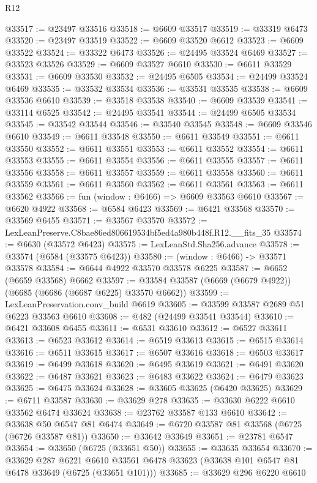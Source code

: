 \begin{lexlean}{R12}
\begin{coremodule}
@33517 := @23497 @33516
@33518 := @6609 @33517
@33519 := @33319 @6473
@33520 := @23497 @33519
@33522 := @6609 @33520 @6612
@33523 := @6609 @33522
@33524 := @33322 @6473
@33526 := @24495 @33524 @6469
@33527 := @33523 @33526
@33529 := @6609 @33527 @6610
@33530 := @6611 @33529
@33531 := @6609 @33530
@33532 := @24495 @6505
@33534 := @24499 @33524 @6469
@33535 := @33532 @33534
@33536 := @33531 @33535
@33538 := @6609 @33536 @6610
@33539 := @33518 @33538
@33540 := @6609 @33539
@33541 := @33114 @6525
@33542 := @24495 @33541
@33544 := @24499 @6505 @33534
@33545 := @33542 @33544
@33546 := @33540 @33545
@33548 := @6609 @33546 @6610
@33549 := @6611 @33548
@33550 := @6611 @33549
@33551 := @6611 @33550
@33552 := @6611 @33551
@33553 := @6611 @33552
@33554 := @6611 @33553
@33555 := @6611 @33554
@33556 := @6611 @33555
@33557 := @6611 @33556
@33558 := @6611 @33557
@33559 := @6611 @33558
@33560 := @6611 @33559
@33561 := @6611 @33560
@33562 := @6611 @33561
@33563 := @6611 @33562
@33566 := fun (window : @6466) => @6609 @33563 @6610
@33567 := @6620 @4922
@33568 := @6584 @6423
@33569 := @6421 @33568
@33570 := @33569 @6455
@33571 := @33567 @33570
@33572 := LexLeanPreserve.C8bae86ed806619534bf5ed4a980b448f.R12.__fits_35
@33574 := @6630 (@33572 @6423)
@33575 := LexLeanStd.Sha256.advance
@33578 := @33574 (@6584 (@33575 @6423))
@33580 := (window : @6466) -> @33571 @33578
@33584 := @6644 @4922 @33570 @33578 @6225
@33587 := @6652 (@6659 @33568) @6662
@33597 := @33584 @33587 (@6669 (@6679 @4922)) (@6685 (@6686 (@6687 @6225) @33570 @6662))
@33599 := LexLeanPreservation.conv_build @6619
@33605 := @33599 @33587 @2689 @51 @6223 @33563 @6610
@33608 := @482 (@24499 @33541 @33544)
@33610 := @6421 @33608 @6455
@33611 := @6531 @33610
@33612 := @6527 @33611
@33613 := @6523 @33612
@33614 := @6519 @33613
@33615 := @6515 @33614
@33616 := @6511 @33615
@33617 := @6507 @33616
@33618 := @6503 @33617
@33619 := @6499 @33618
@33620 := @6495 @33619
@33621 := @6491 @33620
@33622 := @6487 @33621
@33623 := @6483 @33622
@33624 := @6479 @33623
@33625 := @6475 @33624
@33628 := @33605 @33625 (@6420 @33625)
@33629 := @6711 @33587
@33630 := @33629 @278
@33635 := @33630 @6222 @6610 @33562 @6474 @33624
@33638 := @23762 @33587 @133 @6610
@33642 := @33638 @50 @6547 @81 @6474
@33649 := @6720 @33587 @81 @33568 (@6725 (@6726 @33587 @81))
@33650 := @33642 @33649
@33651 := @23781 @6547
@33654 := @33650 (@6725 (@33651 @50))
@33655 := @33635 @33654
@33670 := @33629
    @287
    @6221
    @6610
    @33561
    @6478
    @33623
    (@33638 @101 @6547 @81 @6478 @33649 (@6725 (@33651 @101)))
@33685 := @33629
    @296
    @6220
    @6610

\end{coremodule}
\end{lexlean}
